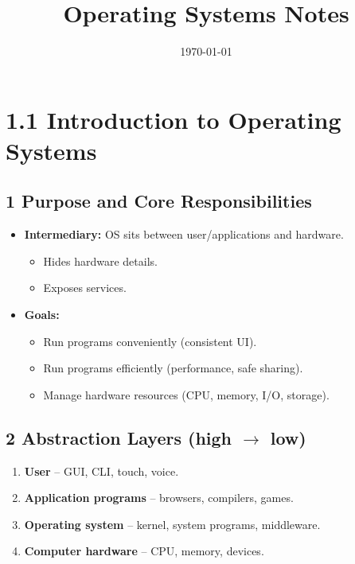 \documentclass{article}
\title{Operating Systems Notes}
\author{} %
\date{\today}
\begin{document}
\linespread{1.0}\selectfont %
\maketitle
\tableofcontents
\newpage
\linespread{0.8}\selectfont %
\section*{1.1 Introduction to Operating Systems}
\subsection*{1 Purpose and Core Responsibilities}
\begin{itemize}
    \item \textbf{Intermediary:} OS sits between user/applications and hardware.
    \begin{itemize}
        \item Hides hardware details.
        \item Exposes services.
    \end{itemize}
    \item \textbf{Goals:}
    \begin{itemize}
        \item Run programs conveniently (consistent UI).
        \item Run programs efficiently (performance, safe sharing).
        \item Manage hardware resources (CPU, memory, I/O, storage).
    \end{itemize}
\end{itemize}

\subsection*{2 Abstraction Layers (high $\rightarrow$ low)}
\begin{enumerate}[label=\arabic*.]
    \item \textbf{User} – GUI, CLI, touch, voice.
    \item \textbf{Application programs} – browsers, compilers, games.
    \item \textbf{Operating system} – kernel, system programs, middleware.
    \item \textbf{Computer hardware} – CPU, memory, devices.
\end{enumerate}
\end{document}
